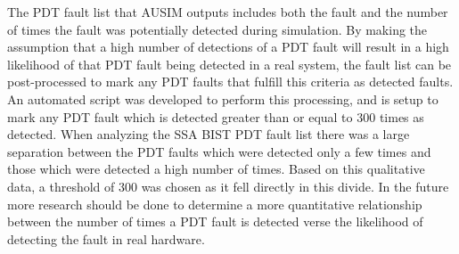 \documentclass[12pt]{report}
\begin{document}
The PDT fault list that AUSIM outputs includes both the fault and the number of times the fault was potentially detected during simulation.  By making the assumption that a high number of detections of a PDT fault will result in a high likelihood of that PDT fault being detected in a real system, the fault list can be post-processed to mark any PDT faults that fulfill this criteria as detected faults.  An automated script was developed to perform this processing, and is setup to mark any PDT fault which is detected greater than or equal to 300 times as detected.  When analyzing the SSA BIST PDT fault list there was a large separation between the PDT faults which were detected only a few times and  those which were detected a high number of times.  Based on this qualitative data, a threshold of 300 was chosen as it fell directly in this divide.  In the future more research should be done to determine a more quantitative relationship between the number of times a PDT fault is detected verse the likelihood of detecting the fault in real hardware.
\end{document}
